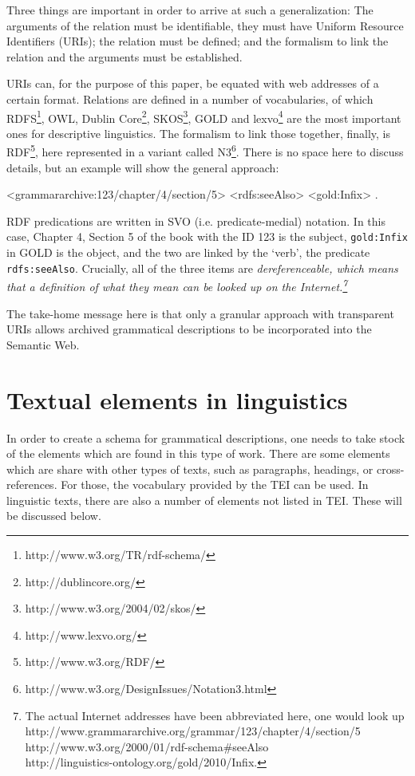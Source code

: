 \documentclass[a4paper,10pt]{article}
\begin{document}
Three things are important in order to arrive at such a generalization: The arguments of the relation must be identifiable, they must have Uniform Resource Identifiers (URIs); the relation must be defined; and the formalism to link the relation and the arguments must be established.

URIs can, for the purpose of this paper, be equated with web addresses of a certain format. Relations are defined in a number of vocabularies, of which RDFS\footnote{http://www.w3.org/TR/rdf-schema/}, OWL, Dublin Core\footnote{http://dublincore.org/}, SKOS\footnote{http://www.w3.org/2004/02/skos/}, GOLD and lexvo\footnote{http://www.lexvo.org/} are the most important ones for descriptive linguistics. The formalism to link those together, finally, is RDF\footnote{http://www.w3.org/RDF/}, here represented in a variant called N3\footnote{http://www.w3.org/DesignIssues/Notation3.html}. There is no space here to discuss details, but an example will show the general approach:
 
\ea <grammararchive:123/chapter/4/section/5>  <rdfs:seeAlso> <gold:Infix> .  \z

RDF predications are written in SVO (i.e. predicate-medial) notation. In this case, Chapter 4, Section 5 of the book with the ID 123 is the subject, \texttt{gold:Infix} in GOLD is the object, and the two are linked by the `verb', the predicate \texttt{rdfs:seeAlso}. Crucially, all of the three items are \em dereferenceable\em, which means that a definition of what they mean can be looked up on the Internet.\footnote{The actual Internet addresses have been abbreviated here, one would look up
http://www.grammararchive.org/grammar/123/chapter/4/section/5\\
http://www.w3.org/2000/01/rdf-schema\#seeAlso\\
http://linguistics-ontology.org/gold/2010/Infix.
}

The take-home message here is that only a granular approach with transparent URIs allows archived grammatical descriptions to be incorporated into the Semantic Web.


\section{Textual elements in linguistics}
In order to create a schema for grammatical descriptions, one needs to take stock of the elements which are found in this type of work. There are some elements which are share with other types of texts, such as paragraphs, headings, or cross-references. For those, the vocabulary provided by the TEI can be used. In linguistic texts, there are also a number of elements not listed in TEI. These will be discussed below.
\end{document}
